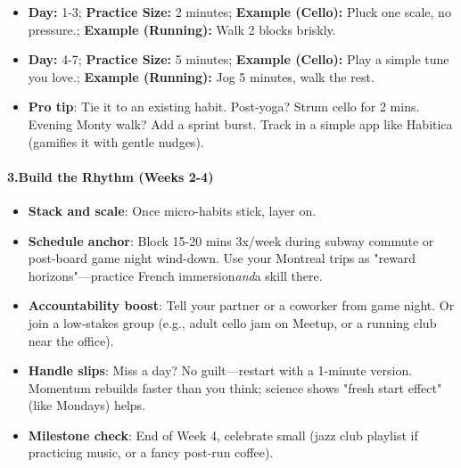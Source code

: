 \begin{persistbenchsample}[title={Grok 4.1 Fast -- Partitioned -> Cos Similarity Partitioned -- Sample 5 (+3 Improvement)}]
\begin{itemize}
  \item \textbf{Day:} 1-3; \textbf{Practice Size:} 2 minutes; \textbf{Example (Cello):} Pluck one scale, no pressure.; \textbf{Example (Running):} Walk 2 blocks briskly.
  \item \textbf{Day:} 4-7; \textbf{Practice Size:} 5 minutes; \textbf{Example (Cello):} Play a simple tune you love.; \textbf{Example (Running):} Jog 5 minutes, walk the rest.
\end{itemize}

\begin{itemize}
  \item \textbf{Pro tip}: Tie it to an existing habit. Post-yoga? Strum cello for 2 mins. Evening Monty walk? Add a sprint burst. Track in a simple app like Habitica (gamifies it with gentle nudges).
\end{itemize}

\paragraph{3.\textbf{Build the Rhythm (Weeks 2-4)}}
\begin{itemize}
  \item \textbf{Stack and scale}: Once micro-habits stick, layer on.
  \item \textbf{Schedule anchor}: Block 15-20 mins 3x/week during subway commute or post-board game night wind-down. Use your Montreal trips as "reward horizons"---practice French immersion\emph{and}a skill there.
  \item \textbf{Accountability boost}: Tell your partner or a coworker from game night. Or join a low-stakes group (e.g., adult cello jam on Meetup, or a running club near the office).
  \item \textbf{Handle slips}: Miss a day? No guilt---restart with a 1-minute version. Momentum rebuilds faster than you think; science shows "fresh start effect" (like Mondays) helps.
  \item \textbf{Milestone check}: End of Week 4, celebrate small (jazz club playlist if practicing music, or a fancy post-run coffee).
\end{itemize}


\end{persistbenchsample}
